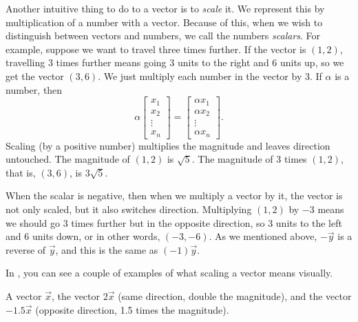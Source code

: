 Another intuitive thing to do to a vector is to
\emph{scale} it.
We represent this by multiplication of a number with a vector.
Because of this, when we wish to distinguish between vectors and numbers, we
call the numbers \emph{scalars}.
For example,
suppose we want to travel three times further.  If the vector is $(1,2)$,
travelling 3 times further means going 3 units to the right and 6 units up,
so we get the vector $(3,6)$.
We just multiply each number in the vector by 3.
If $\alpha$ is a number, then
\begin{equation*}
\alpha
\begin{bmatrix}
x_{1} \\ x_2 \\ \vdots \\ x_n
\end{bmatrix} =
\begin{bmatrix}
\alpha x_{1} \\ \alpha x_2 \\ \vdots \\ \alpha x_n
\end{bmatrix} .
\end{equation*}
Scaling (by a positive number) multiplies the magnitude
and leaves direction untouched.
The magnitude of $(1,2)$
is $\sqrt{5}$.  The magnitude of 3 times $(1,2)$, that is, $(3,6)$, is
$3\sqrt{5}$.

When the scalar is negative, then when we multiply a vector by it, the
vector is not only scaled, but it also switches direction.
Multiplying $(1,2)$ by $-3$ means we should go 3 times further but in the
opposite direction, so 3 units to the left and 6 units down, or in other
words, $(-3,-6)$.  As we mentioned above, $-\vec{y}$ is a reverse of
$\vec{y}$, and this is the same as $(-1)\vec{y}$.

In , you can see a couple of examples of
what scaling a vector means visually.

\begin{myfig}
\capstart
{}
\caption{A vector $\vec{x}$, the vector $2\vec{x}$ (same direction,
double the magnitude), and the vector $-1.5\vec{x}$ (opposite direction,
1.5 times the magnitude).\label{linalg-vecscale:fig}}
\end{myfig}


